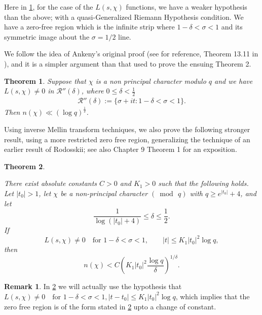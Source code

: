 \documentclass[letter,12pt]{article}
\newcounter{rmk}
\theoremstyle{plain}
\newtheorem{theorem}{Theorem}
\theoremstyle{definition}
\newtheorem{remark}[rmk]{Remark}
\theoremstyle{plain}
\begin{document}
Here in \cref{thm2}, for the case of the $L(s,\chi)$ functions, we have a weaker hypothesis than the above; with a quasi-Generalized Riemann Hypothesis condition. We have a zero-free region which is the infinite strip where $1-\delta< \sigma<1$ and its symmetric image about  the $\sigma=1/2$ line. 

We follow the idea of Ankeny's original proof (see for reference, Theorem 13.11 in \cite{Mont}), and it is a simpler argument than that used to prove the ensuing Theorem 2.
\begin{theorem}\label{thm2}
    Suppose that $\chi$ is a non principal character modulo $q$ and we have $L(s,\chi)\neq 0$ in $\mathcal{R}''(\delta)$, where $0 \leq \delta< \frac{1}{2}$
    \begin{align}
    \mathcal{R}'' (\delta):=\{\sigma+it: 1-\delta<\sigma <1 \}.
\end{align} Then $n(\chi)\ll (\log q)^{\frac{1}{\delta}}$.
\end{theorem}
 Using inverse Mellin transform techniques, we also prove the following stronger result, using a more restricted zero free region, generalizing the technique of an earlier result of Rodosskii\cite{Rodo}; see also \cite{Mont2} Chapter 9 Theorem 1 for an exposition.




\begin{theorem}\label{mainthm}

There exist absolute constants $C>0$ and $K_1>0$ such that the following holds.
Let $|t_0|>1$, let $\chi$ be a non-principal character $(\bmod\, q)$ with
$q \ge e^{|t_0|}+4$, and let
\[
\frac{1}{\log(|t_0|+4)} \le \delta \le \frac{1}{2}.
\]
If
\[
L(s,\chi)\neq 0 \quad \text{for } 1-\delta<\sigma<1, \qquad
|t| \le K_1 |t_0|^2 \log q,
\]
then
\[
n(\chi) < C\left( K_1 |t_0|^2 \frac{\log q}{\delta} \right)^{1/\delta}.
\]
\end{theorem}


\begin{remark}In \cref{mainthm} we will actually use the hypothesis that $L(s,\chi)\neq 0 \quad \text{for } 1-\delta<\sigma<1, 
|t-t_0| \le K_1 |t_0|^2 \log q$, which implies that the zero free region is of the form stated in \cref{mainthm} upto a change of constant.\end{remark}
\end{document}
